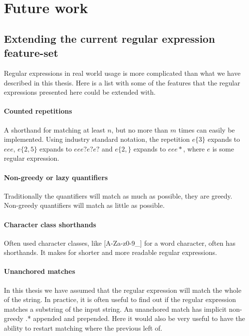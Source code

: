 \section{Future work}
\label{sec:future}

\subsection{Extending the current regular expression feature-set}

Regular expressions in real world usage is more complicated than what
we have described in this thesis. Here is a list with some of the
features that the regular expressions presented here could be extended
with.

\paragraph{Counted repetitions} A shorthand for matching at least $n$, but
no more than $m$ times can easily be implemented. Using industry
standard notation, the repetition $e\{3\}$ expands to $eee$,
$e\{2,5\}$ expands to $eee?e?e?$ and $e\{2,\}$ expands to $eee*$,
where $e$ is some regular expression.

\paragraph{Non-greedy or lazy quantifiers} Traditionally the quantifiers will
match as much as possible, they are greedy. Non-greedy quantifiers
will match as little as possible.

\paragraph{Character class shorthands} Often used character classes,
like \textsf{[A-Za-z0-9\_]} for a word character, often has
shorthands. It makes for shorter and more readable regular
expressions.

\paragraph{Unanchored matches} In this thesis we have assumed that the
regular expression will match the whole of the string. In practice, it
is often useful to find out if the regular expression matches a
substring of the input string. An unanchored match has implicit
non-greedy \textsf{.*} appended and prepended. Here it would also be
very useful to have the ability to restart matching where the previous
left of. 

